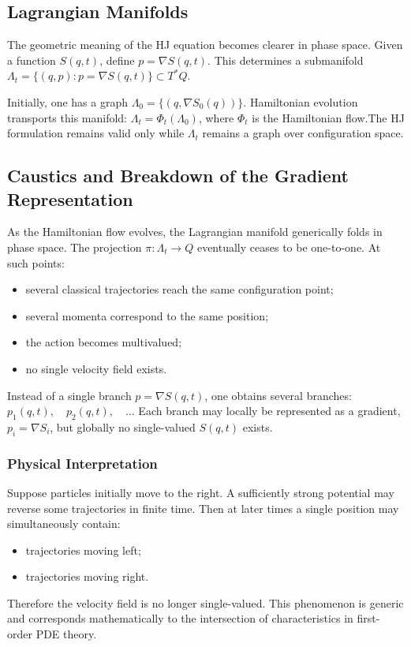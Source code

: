 \subsection{Lagrangian Manifolds}

The geometric meaning of the HJ equation becomes clearer in phase space.
Given a function $S(q,t)$, define $p=\nabla S(q,t)$.
This determines a submanifold $\Lambda_t=\{(q,p):p=\nabla S(q,t)\}\subset T^*Q$.

Initially, one has a graph $\Lambda_0=\{(q,\nabla S_0(q))\}$.
Hamiltonian evolution transports this manifold: $\Lambda_t=\Phi_t(\Lambda_0)$,
where $\Phi_t$ is the Hamiltonian flow.The HJ formulation remains valid only 
while $\Lambda_t$ remains a graph over configuration space.

\subsection{Caustics and Breakdown of the Gradient Representation}

As the Hamiltonian flow evolves, the Lagrangian manifold generically folds in
phase space. The projection $\pi:\Lambda_t\to Q$ eventually ceases to be
one-to-one. At such points:
\begin{itemize}
\item several classical trajectories reach the same configuration point;
\item several momenta correspond to the same position;
\item the action becomes multivalued;
\item no single velocity field exists.
\end{itemize}
Instead of a single branch $p=\nabla S(q,t)$,
one obtains several branches: $p_1(q,t),\quad p_2(q,t),\quad \dots$
Each branch may locally be represented as a gradient,
$p_i=\nabla S_i$, but globally no single-valued $S(q,t)$ exists.

\subsubsection{Physical Interpretation}

Suppose particles initially move to the right. A sufficiently strong potential
may reverse some trajectories in finite time. Then at later times a single
position may simultaneously contain:
\begin{itemize}
\item trajectories moving left;
\item trajectories moving right.
\end{itemize}
Therefore the velocity field is no longer single-valued.
This phenomenon is generic and corresponds mathematically to the intersection
of characteristics in first-order PDE theory.

